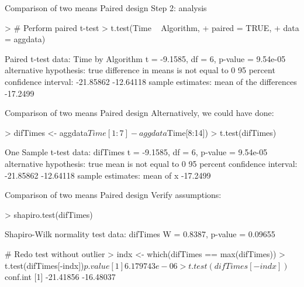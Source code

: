 \documentclass[t]{beamer}
\begin{document}

\begin{ftstf}
{Comparison of two means}
{Paired design}
Step 2: analysis
\begin{rcode}
> # Perform paired t-test
> t.test(Time ~ Algorithm,
+        paired = TRUE,
+        data   = aggdata)

Paired t-test
data:  Time by Algorithm
t = -9.1585, df = 6, p-value = 9.54e-05
alternative hypothesis: true difference in means is not equal to 0
95 percent confidence interval:
 -21.85862 -12.64118
sample estimates:
mean of the differences 
               -17.2499 
\end{rcode}
\end{ftstf}


\begin{ftstf}
{Comparison of two means}
{Paired design}
Alternatively, we could have done:
\begin{rcode}
> difTimes <- aggdata$Time[1:7] - aggdata$Time[8:14])
> t.test(difTimes)


One Sample t-test
data:  difTimes
t = -9.1585, df = 6, p-value = 9.54e-05
alternative hypothesis: true mean is not equal to 0
95 percent confidence interval:
 -21.85862 -12.64118
sample estimates:
mean of x 
 -17.2499 
\end{rcode}
\end{ftstf}


\begin{ftstf}
{Comparison of two means}
{Paired design}
Verify assumptions:
\begin{rcode}
> shapiro.test(difTimes)

Shapiro-Wilk normality test
data:  difTimes
W = 0.8387, p-value = 0.09655

# Redo test without outlier
> indx <- which(difTimes == max(difTimes))
> t.test(difTimes[-indx])$p.value
[1] 6.179743e-06
> t.test(difTimes[-indx])$conf.int
[1] -21.41856 -16.48037
\end{rcode}
\end{ftstf}
\end{document}
